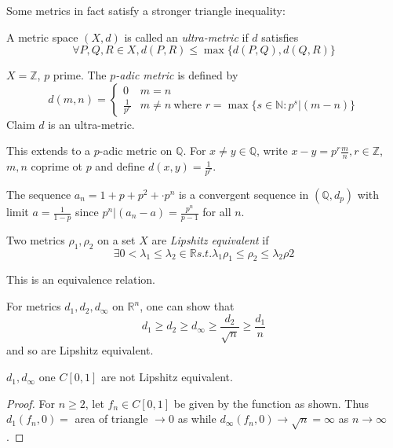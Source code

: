 \documentclass[a4paper]{article}
\begin{document}
Some metrics in fact satisfy a stronger triangle inequality:

\begin{definition}
  A metric space $(X,d)$ is called an \emph{ultra-metric} if $d$ satisfies
  \[
    \forall P,Q,R \in X, d(P,R) \leq \max\{d(P,Q), d(Q,R)\}
  \]
  
\end{definition}

\begin{ex}
  $X=\mathbb{Z}$, $p$ prime. The \emph{$p$-adic metric} is defined by
  \[
    d(m,n) =
    \begin{cases}
      0 & m = n \\
      \frac{1}{p^r} & m \neq n \: \text{where } r = \max\{s\in\mathbb{N}: p^s|(m-n)\}
    \end{cases}
  \]
  Claim $d$ is an ultra-metric.
\end{ex}

This extends to a $p$-adic metric on $\mathbb{Q}$. For $x\neq y \in \mathbb{Q}$, write $x-y = p^r \frac{m}{n}, r\in\mathbb{Z}$, $m, n$ coprime ot $p$ and define $d(x,y) = \frac{1}{p^r}$.

\begin{ex}
  The sequence $a_n = 1+p+p^2+\cdot p^n$ is a convergent sequence in $(\mathbb{Q},d_p)$ with limit $a = \frac{1}{1-p}$ since $p^n | (a_n-a) = \frac{p^n}{p-1}$ for all $n$.
\end{ex}

\begin{definition}
  Two metrics $\rho_1, \rho_2$ on a set $X$ are \emph{Lipshitz equivalent} if
  \[
    \exists 0 < \lambda_1 \leq \lambda_2 \in \mathbb{R} s.t. \lambda_1 \rho_1 \leq \rho_2 \leq \lambda_2\rho2
  \]
  
\end{definition}

This is an equivalence relation.

\begin{remark}
  For metrics $d_1, d_2, d_\infty$ on $\mathbb{R}^n$, one can show that
  \[
    d_1 \geq d_2 \geq d_\infty \geq \frac{d_2}{\sqrt n} \geq \frac{d_1}{n}
  \]
  and so are Lipshitz equivalent.
\end{remark}

\begin{proposition}
  $d_1,d_\infty$ one $C[0,1]$ are not Lipshitz equivalent.
\end{proposition}

\begin{proof}
  For $n \geq 2$, let $f_n \in C[0,1]$ be given by the function as shown. Thus $d_1(f_n,0) =$ area of triangle $\to 0$ as while $d_\infty(f_n,0) \to \sqrt n = \infty$ as $n \to \infty$.
\end{proof}
\end{document}

